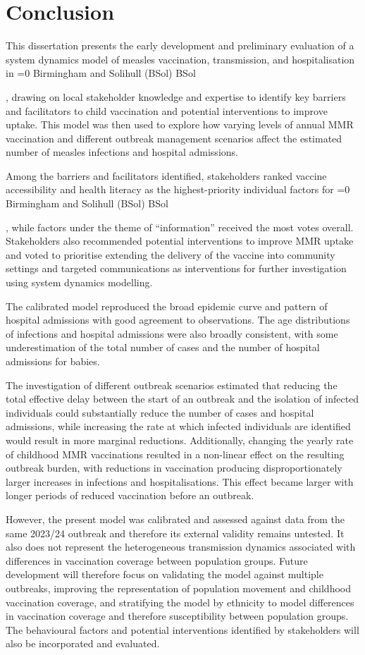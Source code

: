 \documentclass[12pt]{article}
\newcounter{bsol}
\newcommand{\bsol}{%
    \ifnum\value{bsol}=0
        \stepcounter{bsol}%
        Birmingham and Solihull (BSol)%
        \else
        BSol%
    \fi%
    \xspace
}
\begin{document}
\section{Conclusion}

This dissertation presents the early development and preliminary evaluation of a system dynamics model of measles vaccination, transmission, and hospitalisation in \bsol, drawing on local stakeholder knowledge and expertise to identify key barriers and facilitators to child vaccination and potential interventions to improve uptake. This model was then used to explore how varying levels of annual MMR vaccination and different outbreak management scenarios affect the estimated number of measles infections and hospital admissions.

Among the barriers and facilitators identified, stakeholders ranked vaccine accessibility and health literacy as the highest-priority individual factors for \bsol, while factors under the theme of ``information'' received the most votes overall. Stakeholders also recommended potential interventions to improve MMR uptake and voted to prioritise extending the delivery of the vaccine into community settings and targeted communications as interventions for further investigation using system dynamics modelling. 

The calibrated model reproduced the broad epidemic curve and pattern of hospital admissions with good agreement to observations. The age distributions of infections and hospital admissions were also broadly consistent, with some underestimation of the total number of cases and the number of hospital admissions for babies.

The investigation of different outbreak scenarios estimated that reducing the total effective delay between the start of an outbreak and the isolation of infected individuals could substantially reduce the number of cases and hospital admissions, while increasing the rate at which infected individuals are identified would result in more marginal reductions. Additionally, changing the yearly rate of childhood MMR vaccinations resulted in a non-linear effect on the resulting outbreak burden, with reductions in vaccination producing disproportionately larger increases in infections and hospitalisations. This effect became larger with longer periods of reduced vaccination before an outbreak.

However, the present model was calibrated and assessed against data from the same 2023/24 outbreak and therefore its external validity remains untested. It also does not represent the heterogeneous transmission dynamics associated with differences in vaccination coverage between population groups. Future development will therefore focus on validating the model against multiple outbreaks, improving the representation of population movement and childhood vaccination coverage, and stratifying the model by ethnicity to model differences in vaccination coverage and therefore susceptibility between population groups. The behavioural factors and potential interventions identified by stakeholders will also be incorporated and evaluated.
\end{document}
